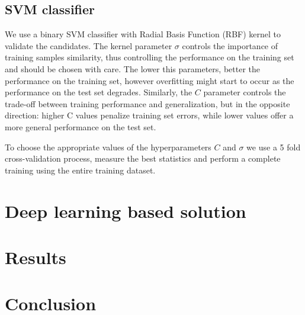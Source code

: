     \subsection{SVM classifier}
      We use a binary SVM classifier with Radial Basis Function (RBF) kernel to validate the candidates. The kernel parameter $\sigma$ controls the importance of training samples similarity, thus controlling the performance on the training set and should be chosen with care. The lower this parameters, better the performance on the training set, however overfitting might start to occur as the performance on the test set degrades. Similarly, the $C$ parameter controls the trade-off between training performance and generalization, but in the opposite direction: higher C values penalize training set errors, while lower values offer a more general performance on the test set.

      To choose the appropriate values of the hyperparameters $C$ and $\sigma$ we use a 5 fold cross-validation process, measure the best statistics and perform a complete training using the entire training dataset.


\section{Deep learning based solution}
\label{sec:deep}

\section{Results}
\label{sec:results}

\section{Conclusion}
\label{sec:conclusion}
